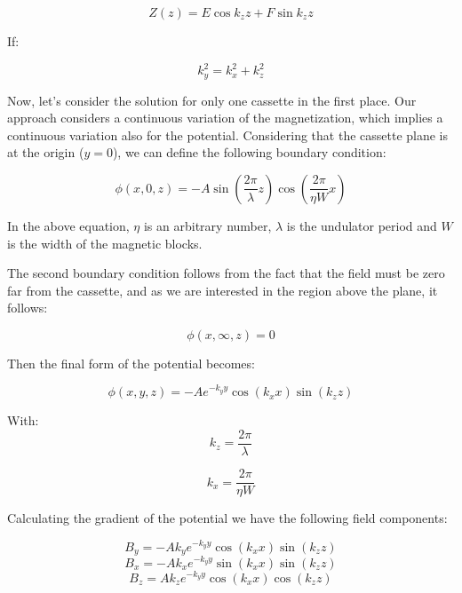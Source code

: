 \documentclass{article}
\begin{document}
\begin{equation}
Z(z) = E\cos{k_zz} + F\sin{k_zz}
\end{equation}

If:

\begin{equation}
k_{y}^2 = k_{x}^2 + k_{z}^2
\end{equation}

Now, let's consider the solution for only one cassette in the first place. Our approach considers a continuous variation of the magnetization, which implies a continuous variation also for the potential. Considering that the cassette plane is at the origin ($y=0$), we can define the following boundary condition:

\begin{equation}
\phi(x, 0, z) = -A \sin{\left(\frac{2 \pi}{\lambda}z\right)} \cos{\left(\frac{2 \pi}{\eta W}x\right)}
\label{eq:phi}
\end{equation}

In the above equation, $\eta$ is an arbitrary number, $\lambda$ is the undulator period
and $W$ is the width of the magnetic blocks.

The second boundary condition follows from the fact that the field must be zero far from the cassette, and as we are interested in the region above the plane, it follows:

\begin{equation}
\phi(x, \infty, z) = 0
\label{eq:far}
\end{equation}

Then the final form of the potential becomes:

\begin{equation}
\phi(x, y, z) = -Ae^{-k_yy}\cos{\left(k_xx\right)}\sin{\left(k_zz\right)}
\label{eq:phifinal}
\end{equation}

With:
\begin{equation}
k_{z} = \frac{2\pi}{\lambda}
\end{equation}

\begin{equation}
k_{x} = \frac{2\pi}{\eta W}
\end{equation}

Calculating the gradient of the potential we have the following field components:

\begin{equation}
B_y = -Ak_ye^{-k_yy}\cos(k_xx)\sin(k_zz)
\end{equation}
\begin{equation}
B_x = -Ak_xe^{-k_yy}\sin(k_xx)\sin(k_zz)
\end{equation}
\begin{equation}
B_z = Ak_ze^{-k_yy}\cos(k_xx)\cos(k_zz)
\end{equation}
\end{document}
